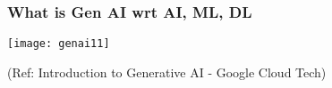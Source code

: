 





\begin{frame}[fragile]\frametitle{What is Gen AI wrt AI, ML, DL}

\begin{center}
\texttt{[image: genai11]}
\end{center}

{\tiny (Ref: Introduction to Generative AI - Google Cloud Tech)}

\end{frame}


